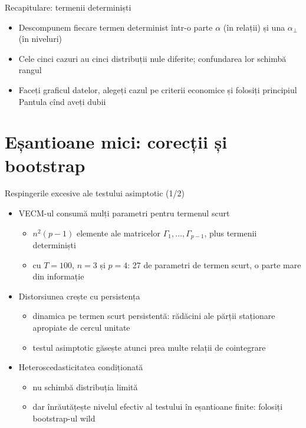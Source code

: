 \begin{frame}{Recapitulare: termenii determiniști}
\itemsize{\small}
\begin{itemize}
    \item Descompunem fiecare termen determinist într-o parte $\alpha$ (în relații) și una $\alpha_\perp$ (în niveluri)
    \item Cele cinci cazuri au cinci distribuții nule diferite; confundarea lor schimbă rangul
    \item Faceți graficul datelor, alegeți cazul pe criterii economice și folosiți principiul Pantula cînd aveți dubii
\end{itemize}
\end{frame}


\section{Eșantioane mici: corecții și bootstrap}

\begin{frame}{Respingerile excesive ale testului asimptotic (1/2)}
\itemsize{\small}
\begin{itemize}
    \item VECM-ul consumă mulți parametri pentru termenul scurt
    \begin{itemize}
        \item $n^2(p - 1)$ elemente ale matricelor $\Gamma_1, \dots, \Gamma_{p-1}$, plus termenii determiniști
        \item cu $T = 100$, $n = 3$ și $p = 4$: 27 de parametri de termen scurt, o parte mare din informație
    \end{itemize}
    \item Distorsiunea crește cu persistența
    \begin{itemize}
        \item dinamica pe termen scurt persistentă: rădăcini ale părții staționare apropiate de cercul unitate
        \item testul asimptotic găsește atunci prea multe relații de cointegrare
    \end{itemize}
    \item Heteroscedasticitatea condiționată 
    \begin{itemize}
        \item nu schimbă distribuția limită
        \item dar înrăutățește nivelul efectiv al testului în eșantioane finite: folosiți bootstrap-ul wild
    \end{itemize}
\end{itemize}
\end{frame}

